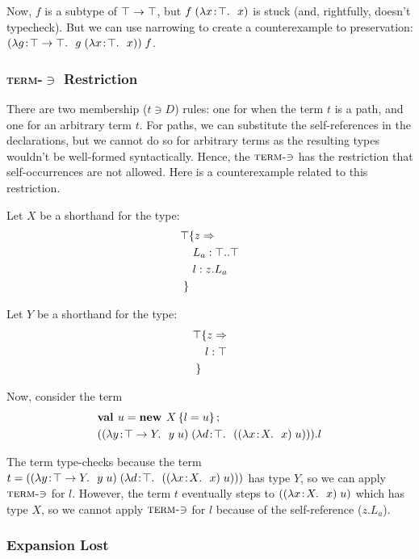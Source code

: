 \documentclass[preprint]{sigplanconf}
\begin{document}
Now, $f$ is a subtype of $\top \rightarrow \top$, but $f\;(\lambda x\!:\!\top.\ \ x)$ is stuck (and, rightfully, doesn't typecheck). But we can use
narrowing to create a counterexample to preservation: $(\lambda g\!:\!\top \rightarrow \top.\ \ g\;(\lambda x\!:\!\top.\ \ x))\;f$.

\subsubsection{\texorpdfstring{\textsc{term-$\ni$}}{Term-Mem} Restriction}\label{term_mem}

There are two membership ($t \ni D$) rules: one for when the term $t$
is a path, and one for an arbitrary term $t$. For paths, we can
substitute the self-references in the declarations, but we cannot do
so for arbitrary terms as the resulting types wouldn't be well-formed
syntactically. Hence, the $\textsc{term-$\ni$}$ has the restriction
that self-occurrences are not allowed. Here is a counterexample related
to this restriction.

Let $X$ be a shorthand for the type:
\begin{align*}
\top & \{z \Rightarrow \\
&\ L_a : \top..\top\\
&\ l : z.L_a\\
 \}&
\end{align*}

Let $Y$ be a shorthand for the type:
\begin{align*}
\top & \{z \Rightarrow \\
&\ l : \top\\
 \}&
\end{align*}

Now, consider the term
\begin{align*}
&\mlnew u {X \ldefs{ l = u }}{
(\app {(\abs y {\Top \tfun Y} {\app y u})} {(\abs d \Top {(\app {(\abs x X x)} u)})}).l
}
\end{align*}

The term type-checks because the term $t=((\lambda y\!:\!\top \rightarrow Y.\ \ y\;u)\;(\lambda d\!:\!\top.\ \ ((\lambda x\!:\!X.\ \ x)\;u)))$ has type
$Y$, so we can apply $\textsc{term-$\ni$}$ for $l$. However, the term
$t$ eventually steps to $((\lambda x\!:\!X.\ \ x)\;u)$ which has type $X$,
so we cannot apply $\textsc{term-$\ni$}$ for $l$ because of the
self-reference ($z.L_a$).

\subsubsection{Expansion Lost}\label{narrowing_exp}
\end{document}
